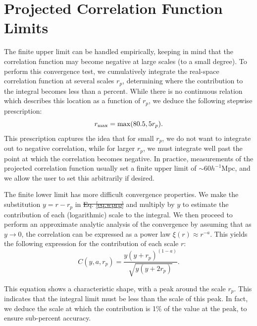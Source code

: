 \documentclass[5p,aas_macros]{elsarticle}
\providecommand{\DIFaddtex}[1]{{\protect\color{blue}\uwave{#1}}} %
\providecommand{\DIFdeltex}[1]{{\protect\color{red}\sout{#1}}}                      %
\providecommand{\DIFaddbegin}{} %
\providecommand{\DIFaddend}{} %
\providecommand{\DIFdelbegin}{} %
\providecommand{\DIFdelend}{} %
\providecommand{\DIFadd}[1]{\texorpdfstring{\DIFaddtex{#1}}{#1}} %
\providecommand{\DIFdel}[1]{\texorpdfstring{\DIFdeltex{#1}}{}} %
\begin{document}
\section{Projected Correlation Function Limits}
\label{app:proj}
The finite upper limit can be handled empirically, keeping in mind that the correlation function may become negative at large scales (to a small degree). 
To perform this convergence test, we cumulatively integrate the real-space correlation function at several scales $r_p$, determining where the contribution to the integral becomes less than a percent. 
While there is no continuous relation which describes this location as a function of $r_p$, we deduce the following stepwise prescription:
\begin{equation}
	r_{\rm max} = {\rm max}(80.5,5r_p).
\end{equation}
This prescription captures the idea that for small $r_p$, we do not want to integrate out to negative correlation, while for larger $r_p$, we must integrate well past the point at which the correlation becomes negative. In practice, measurements of the projected correlation function usually set a finite upper limit of $\sim 60 h^{-1}$Mpc, and we allow the user to set this arbitrarily if desired.

The finite lower limit has more difficult convergence properties. We make the substitution $y=r-r_p$ in \DIFdelbegin \DIFdel{Eq. \ref{eq:wprp} }\DIFdelend \DIFaddbegin \DIFadd{\mbox{%
\cref{eq:wprp} }\hspace{0pt}%
}\DIFaddend and multiply by $y$ to estimate the contribution of each (logarithmic) scale to the integral. We then proceed to perform an approximate analytic analysis of the convergence by assuming that as $y \rightarrow 0$, the correlation can be expressed as a power law $\xi(r) \approx r^{-a}$. This yields the following expression for the contribution of each scale $r$:
 \begin{equation}
 	\label{eq:projcorrcontr}
 	C(y,a,r_p) = \frac{y(y+r_p)^{(1-a)}}{\sqrt{y(y+2r_p)}}.
 \end{equation} 
\DIFdelbegin %

\DIFdelend This equation shows a characteristic shape, with a peak around the scale $r_p$. 
This indicates that the integral limit must be less than the scale of this peak.
In fact, we deduce the scale at which the contribution is 1\% of the value at the peak, to ensure sub-percent accuracy.
\end{document}

